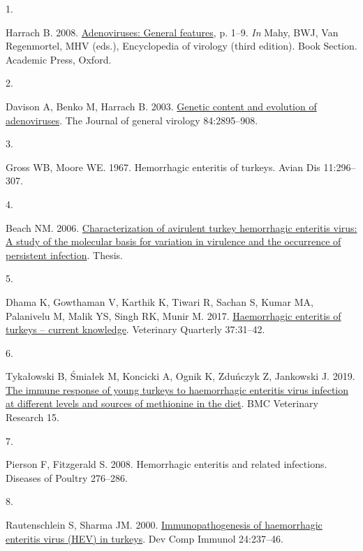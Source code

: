 \documentclass[
]{article}
\newlength{\cslhangindent}
\newlength{\csllabelwidth}
\newenvironment{CSLReferences}[2] %
 {\begin{list}{}{%
  \setlength{\itemindent}{0pt}
  \setlength{\leftmargin}{0pt}
  \setlength{\parsep}{0pt}
  \ifodd #1
   \setlength{\leftmargin}{\cslhangindent}
   \setlength{\itemindent}{-1\cslhangindent}
  \fi
  \setlength{\itemsep}{#2\baselineskip}}}
 {\end{list}}
\newcommand{\CSLLeftMargin}[1]{\parbox[t]{\csllabelwidth}{\strut#1\strut}}
\newcommand{\CSLRightInline}[1]{\parbox[t]{\linewidth - \csllabelwidth}{\strut#1\strut}}
\begin{document}
\label{refs}
\begin{CSLReferences}{0}{1}
\CSLLeftMargin{1. }%
\CSLRightInline{Harrach B. 2008.
\href{https://doi.org/10.1016/B978-012374410-4.00680-4}{Adenoviruses:
General features}, p. 1--9. \emph{In} Mahy, BWJ, Van Regenmortel, MHV
(eds.), Encyclopedia of virology (third edition). Book Section. Academic
Press, Oxford.}

\CSLLeftMargin{2. }%
\CSLRightInline{Davison A, Benko M, Harrach B. 2003.
\href{https://doi.org/10.1099/vir.0.19497-0}{Genetic content and
evolution of adenoviruses}. The Journal of general virology
84:2895--908.}

\CSLLeftMargin{3. }%
\CSLRightInline{Gross WB, Moore WE. 1967. Hemorrhagic enteritis of
turkeys. Avian Dis 11:296--307.}

\CSLLeftMargin{4. }%
\CSLRightInline{Beach NM. 2006.
\href{http://scholar.lib.vt.edu/theses/available/etd-08142006-145339/}{Characterization
of avirulent turkey hemorrhagic enteritis virus: A study of the
molecular basis for variation in virulence and the occurrence of
persistent infection}. Thesis.}

\CSLLeftMargin{5. }%
\CSLRightInline{Dhama K, Gowthaman V, Karthik K, Tiwari R, Sachan S,
Kumar MA, Palanivelu M, Malik YS, Singh RK, Munir M. 2017.
\href{https://doi.org/10.1080/01652176.2016.1277281}{Haemorrhagic
enteritis of turkeys -- current knowledge}. Veterinary Quarterly
37:31--42.}

\CSLLeftMargin{6. }%
\CSLRightInline{Tykałowski B, Śmiałek M, Koncicki A, Ognik K, Zduńczyk
Z, Jankowski J. 2019.
\href{https://doi.org/10.1186/s12917-019-2138-8}{The immune response of
young turkeys to haemorrhagic enteritis virus infection at different
levels and sources of methionine in the diet}. BMC Veterinary Research
15.}

\CSLLeftMargin{7. }%
\CSLRightInline{Pierson F, Fitzgerald S. 2008. Hemorrhagic enteritis and
related infections. Diseases of Poultry 276--286.}

\CSLLeftMargin{8. }%
\CSLRightInline{Rautenschlein S, Sharma JM. 2000.
\href{https://doi.org/10.1016/s0145-305x(99)00075-0}{Immunopathogenesis
of haemorrhagic enteritis virus (HEV) in turkeys}. Dev Comp Immunol
24:237--46.}


\end{CSLReferences}
\end{document}
